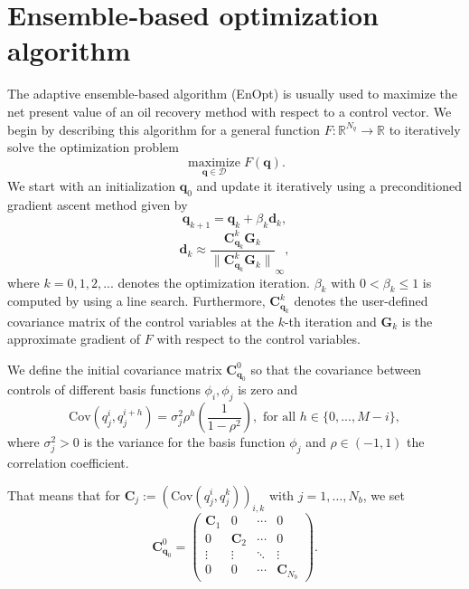 \chapter{ Ensemble‑based optimization algorithm}


The adaptive ensemble-based algorithm (EnOpt) is usually used to maximize the net present value of an oil recovery method with respect to a control vector. We begin by describing this algorithm for a general function $F:\mathbb{R}^{N_q}\to \mathbb{R}$ to iteratively solve the optimization problem
\begin{displaymath}
\operatorname*{maximize}_{\mathbf{q}\in\mathcal{D}}F(\mathbf{q}).
\end{displaymath}
We start with an initialization $\mathbf{q}_0$ and update it iteratively using a preconditioned gradient ascent method given by
\begin{displaymath}
\mathbf{q}_{k+1} = \mathbf{q}_k+\beta_k\mathbf{d}_k,
\end{displaymath}
\begin{displaymath}
\mathbf{d}_k\approx\frac{\mathbf{C}_{\mathbf{q}_k}^k\mathbf{G}_k}{\|\mathbf{C}_{\mathbf{q}_k}^k\mathbf{G}_k\|}_\infty,
\end{displaymath}
where $k=0,1,2,...$ denotes the optimization iteration. $\beta_k$ with $0<\beta_k\leq1$ is computed by using a line search. Furthermore, $\mathbf{C}_{\mathbf{q}_k}^k$ denotes the user-defined covariance matrix of the control variables at the $k$-th iteration and $\mathbf{G}_k$ is the approximate gradient of $F$ with respect to the control variables.

We define the initial covariance matrix $\mathbf{C}_{\mathbf{q}_0}^0$ so that the covariance between controls of different basis functions $\phi_i,\phi_j$ is zero and
\begin{displaymath}
\mathrm{Cov}(q_j^i,q_j^{i+h})=\sigma_j^2\rho^h\left(\frac{1}{1-\rho^2}\right),\text{ for all }h\in\{0,...,M-i\},
\end{displaymath}
where $\sigma_j^2>0$ is the variance for the basis function $\phi_j$ and $\rho\in(-1,1)$ the correlation coefficient.

That means that for $\mathbf{C}_j:=\left(\mathrm{Cov}(q_j^i,q_j^{k})\right)_{i,k}$ with $j=1,\dotsc,N_b$, we set
\begin{displaymath}
\mathbf{C}_{\mathbf{q}_0}^0 =
\begin{pmatrix}
  \mathbf{C}_1 & 0 & \cdots & 0 \\
  0 & \mathbf{C}_2 & \cdots & 0 \\
  \vdots  & \vdots  & \ddots & \vdots  \\
  0 & 0 & \cdots & \mathbf{C}_{N_b} 
 \end{pmatrix}.
\end{displaymath}

